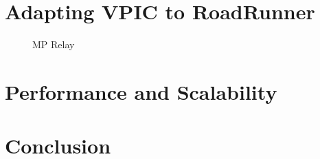 \documentclass[letter,10pt]{article}
\begin{document}
\section*{Adapting VPIC to RoadRunner}

\begin{figure}
    \begin{center}
    \scalebox{0.4}{}
    \caption{MP Relay}
    \label{fig:relay}
    \end{center}
\end{figure}

\section*{Performance and Scalability}

\section*{Conclusion}




\end{document}
